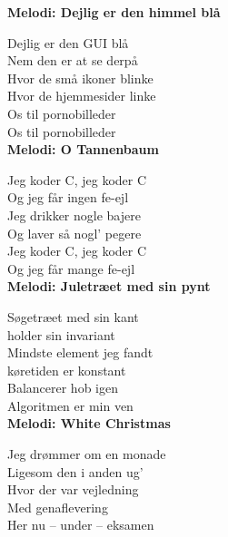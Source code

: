 
\vspace{-2.5mm}
\textbf{Melodi: Dejlig er den himmel blå}

Dejlig er den GUI blå\\
Nem den er at se derpå\\
Hvor de små ikoner blinke\\
Hvor de hjemmesider linke\\
Os til pornobilleder\\
Os til pornobilleder\\


\vspace{-2.5mm}
\textbf{Melodi: O Tannenbaum}

Jeg koder C, jeg koder C\\
Og jeg får ingen fe-ejl\\
Jeg drikker nogle bajere\\
Og laver så nogl' pegere\\
Jeg koder C, jeg koder C\\
Og jeg får mange fe-ejl\\


\vspace{-2.5mm}
\textbf{Melodi: Juletræet med sin pynt}

Søgetræet med sin kant\\
holder sin invariant\\
Mindste element jeg fandt\\
køretiden er konstant\\
Balancerer hob igen\\
Algoritmen er min ven\\


\vspace{-2.5mm}
\textbf{Melodi: White Christmas}

Jeg drømmer om en monade\\
Ligesom den i anden ug'\\
Hvor der var vejledning\\
Med genaflevering\\
Her nu -- under -- eksamen\\


